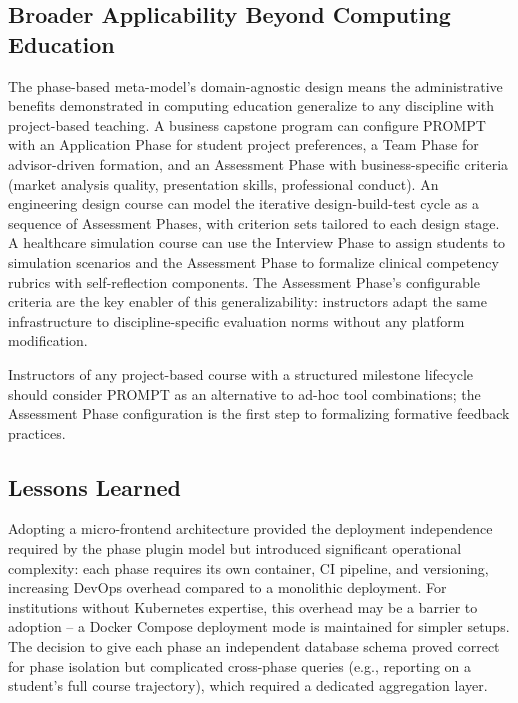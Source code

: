 \subsection{Broader Applicability Beyond Computing Education}

The phase-based meta-model's domain-agnostic design means the administrative benefits demonstrated in computing education generalize to any discipline with project-based teaching.
A business capstone program can configure PROMPT with an Application Phase for student project preferences, a Team Phase for advisor-driven formation, and an Assessment Phase with business-specific criteria (market analysis quality, presentation skills, professional conduct).
An engineering design course can model the iterative design-build-test cycle as a sequence of Assessment Phases, with criterion sets tailored to each design stage.
A healthcare simulation course can use the Interview Phase to assign students to simulation scenarios and the Assessment Phase to formalize clinical competency rubrics with self-reflection components.
The Assessment Phase's configurable criteria are the key enabler of this generalizability:
instructors adapt the same infrastructure to discipline-specific evaluation norms without any platform modification.

\begin{recommendationBox}
Instructors of any project-based course with a structured milestone lifecycle should consider PROMPT as an alternative to ad-hoc tool combinations; the Assessment Phase configuration is the first step to formalizing formative feedback practices.
\end{recommendationBox}

\subsection{Lessons Learned}

Adopting a micro-frontend architecture provided the deployment independence required by the phase plugin model but introduced significant operational complexity:
each phase requires its own container, CI pipeline, and versioning, increasing DevOps overhead compared to a monolithic deployment.
For institutions without Kubernetes expertise, this overhead may be a barrier to adoption -- a Docker Compose deployment mode is maintained for simpler setups.
The decision to give each phase an independent database schema proved correct for phase isolation but complicated cross-phase queries (e.g., reporting on a student's full course trajectory), which required a dedicated aggregation layer.

